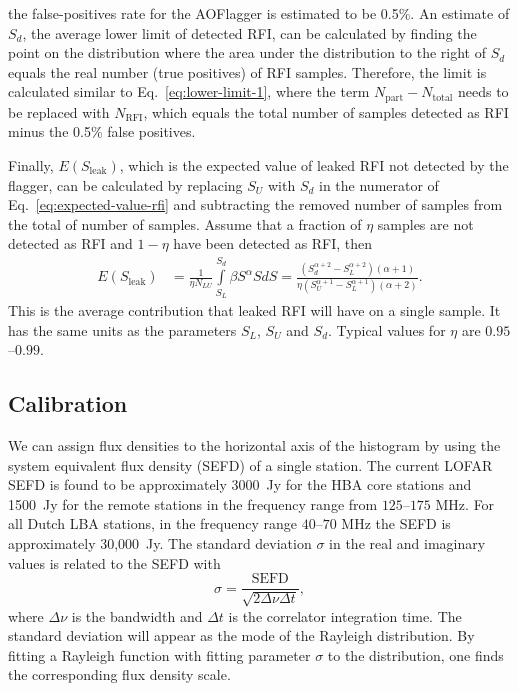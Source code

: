 \documentclass[useAMS,usenatbib]{mn2e}
\begin{document}
\citet{lofar-radio-environment}
the false-positives rate for the AOFlagger is estimated to be 0.5\%. An estimate of $S_d$, the average lower limit of detected RFI, can be calculated by finding the point on the distribution where the area under the distribution to the right of $S_d$ equals the real number (true positives) of RFI samples. Therefore, the limit is calculated similar to Eq.~\eqref{eq:lower-limit-1}, where the term $N_\textrm{part} - N_\textrm{total}$ needs to be replaced with $N_\textrm{RFI}$, which equals the total number of samples detected as RFI minus the 0.5\% false positives.

Finally, $E(S_\textrm{leak})$, which is the expected value of leaked RFI not detected by the flagger, can be calculated by replacing $S_U$ with $S_d$ in the numerator of Eq.~\eqref{eq:expected-value-rfi} and subtracting the removed number of samples from the total of number of samples. Assume that a fraction of $\eta$ samples are not detected as RFI and $1-\eta$ have been detected as RFI, then
\begin{align} \label{eq:expected-value-leaked-rfi}
E(S_\textrm{leak}) & = \frac{1}{\eta N_{LU}}\int\limits_{S_L}^{S_d} \beta S^\alpha S dS
= \frac{\left( S_d^{\alpha+2} - S_L^{\alpha+2} \right) \left( \alpha+1 \right) } {\eta \left( S_U^{\alpha+1} - S_L^{\alpha+1}\right) \left( \alpha+2 \right)}.
\end{align}
This is the average contribution that leaked RFI will have on a single sample. It has the same units as the parameters $S_L$, $S_U$ and $S_d$. Typical values for $\eta$ are $0.95$--$0.99$.

\subsection{Calibration} \label{sec:calibration}
We can assign flux densities to the horizontal axis of the histogram by using the system equivalent flux density (SEFD) of a single station. The current LOFAR SEFD is found to be approximately 3000~Jy for the HBA core stations and 1500~Jy for the remote stations in the frequency range from $125$--$175$ MHz. For all Dutch LBA stations, in the frequency range $40$--$70$ MHz the SEFD is approximately 30,000~Jy. The standard deviation $\sigma$ in the real and imaginary values is related to the SEFD with %
\begin{equation}
 \sigma = \frac{\textrm{SEFD}}{\sqrt{2 \Delta \nu \Delta t}},
\end{equation}
where $\Delta \nu$ is the bandwidth and $\Delta t$ is the correlator integration time. The standard deviation will appear as the mode of the Rayleigh distribution. By fitting a Rayleigh function with fitting parameter $\sigma$ to the distribution, one finds the corresponding flux density scale.
\end{document}
